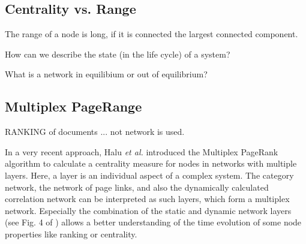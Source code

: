 \documentclass[a4paper,10pt]{scrbook}
\begin{document}
\subsection{Centrality vs. Range}

The range of a node is long, if it is connected the largest connected component.

How can we describe the state (in the life cycle) of a system?

What is a network in equilibium or out of equilibrium?

\subsection{Multiplex PageRange}


RANKING of documents ... not network is used.



In a very recent approach, Halu {\it et al.} \cite{10.1371/journal.pone.0078293} introduced the Multiplex 
PageRank algorithm to calculate a centrality measure for nodes in networks with multiple 
layers.  Here, a layer is an individual aspect of a complex system.  The category network, 
the network of page links, and also the dynamically calculated correlation network can be 
interpreted as such layers, which form a multiplex network.  Especially the combination of 
the static and dynamic network layers (see Fig. 4 of
\cite{10.1371/journal.pone.0078293})
allows a better understanding of the time evolution of some node properties like ranking or 
centrality.  
\end{document}
